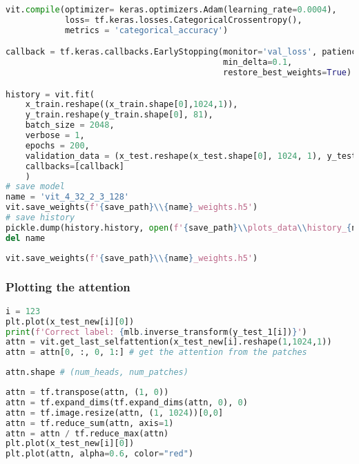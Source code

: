 \begin{lstlisting}[language=Python]
vit.compile(optimizer= keras.optimizers.Adam(learning_rate=0.0004),
            loss= tf.keras.losses.CategoricalCrossentropy(),
            metrics = 'categorical_accuracy')

callback = tf.keras.callbacks.EarlyStopping(monitor='val_loss', patience=7,
                                            min_delta=0.1,
                                            restore_best_weights=True)

history = vit.fit(
    x_train.reshape((x_train.shape[0],1024,1)),
    y_train.reshape(y_train.shape[0], 81),
    batch_size = 2048,
    verbose = 1,
    epochs = 200,
    validation_data = (x_test.reshape(x_test.shape[0], 1024, 1), y_test.reshape(y_test.shape[0],n_elements)),
    callbacks=[callback]
    )
# save model
name = 'vit_4_32_2_3_128'
vit.save_weights(f'{save_path}\\{name}_weights.h5')
# save history
pickle.dump(history.history, open(f'{save_path}\\plots_data\\history_{name}.pkl', 'wb'))
del name
\end{lstlisting}

\begin{lstlisting}[language=Python]
vit.save_weights(f'{save_path}\\{name}_weights.h5')
\end{lstlisting}

\hypertarget{plotting-the-attention}{%
\subsubsection{Plotting the attention}\label{plotting-the-attention}}

\begin{lstlisting}[language=Python]
i = 123
plt.plot(x_test_new[i][0])
print(f'Correct label: {mlb.inverse_transform(y_test_1[i])}')
attn = vit.get_last_selfattention(x_test_new[i].reshape(1,1024,1))
attn = attn[0, :, 0, 1:] # get the attention from the patches
\end{lstlisting}

\begin{lstlisting}[language=Python]
attn.shape # (num_heads, num_patches)
\end{lstlisting}

\begin{lstlisting}[language=Python]
attn = tf.transpose(attn, (1, 0))
attn = tf.expand_dims(tf.expand_dims(attn, 0), 0)
attn = tf.image.resize(attn, (1, 1024))[0,0]
attn = tf.reduce_sum(attn, axis=1)
attn = attn / tf.reduce_max(attn)
plt.plot(x_test_new[i][0])
plt.plot(attn, alpha=0.6, color="red")
\end{lstlisting}


